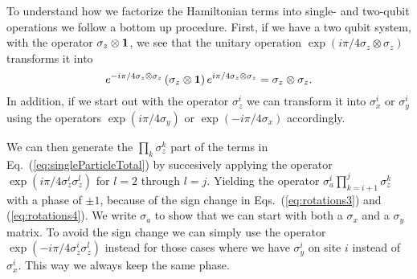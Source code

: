 \documentclass[aps,pra,twocolumn,floatfix]{revtex4}
\begin{document}
To understand how we factorize the Hamiltonian terms into single- and
two-qubit operations we follow a bottom up procedure.
First, 
if we have a two qubit system, with the operator $\sigma_z \otimes
{\bf 1}$, we see that the unitary operation $\exp(i\pi/4 \sigma_z\otimes
\sigma_z)$  transforms it into
\begin{equation}
e^{-i\pi/4 \sigma_z\otimes\sigma_z}\left( \sigma_z\otimes{\bf 1} \right)
e^{i\pi/4 \sigma_z\otimes\sigma_z} = \sigma_z\otimes\sigma_z.
\end{equation} 
In addition, if we start out with the operator $\sigma_z^i$ we can transform it
into $\sigma_x^i$ or $\sigma_y^i$ using the operators
$\exp(i\pi/4\sigma_y)$ or $\exp(-i\pi/4\sigma_x)$ accordingly. 

We can then generate the $\prod_k \sigma_z^k$ part of the terms in
Eq.~(\ref{eq:singleParticleTotal}) by succesively
applying the operator $\exp(i\pi/4\sigma_z^i \sigma_z^l)$ for $l=2$
through $l=j$. Yielding the operator $\sigma_a^i \prod_{k=i+1}^{j}
\sigma_z^k$ with a phase of $\pm1$, because of the sign change in
Eqs.~(\ref{eq:rotations3}) and (\ref{eq:rotations4}). We write
$\sigma_a$ to show that we can start with both a $\sigma_x$ and
a $\sigma_y$ matrix. To avoid the sign
change we can simply use the operator $\exp(-i\pi/4\sigma_z^i
\sigma_z^l)$ instead for those cases where  we have $\sigma_y^i$ on site
$i$ 
instead of $\sigma_x^i$. This way we always keep the same phase.
\end{document}
